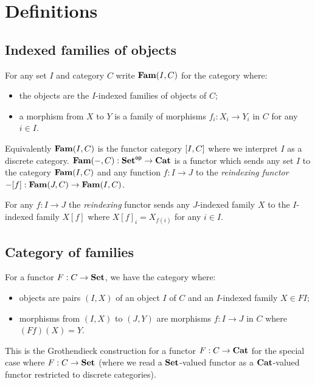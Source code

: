 \section{Definitions}

\subsection{Indexed families of objects}

For any set $I$ and category $C$ write $\mathbf{Fam}(I,C)$ for the category where:
\begin{itemize}
\item the objects are the $I$-indexed families of objects of $C$;
\item a morphism from $X$ to $Y$ is a family of morphisms $f_i: X_i \to Y_i$ in $C$ for any $i \in I$.
\end{itemize}

\noindent Equivalently $\mathbf{Fam}(I,C)$ is the functor category $[I,C]$ where we interpret $I$ as a discrete
category. $\mathbf{Fam}(-,C): \mathbf{Set}^{\mathsf{op}} \to \mathbf{Cat}$ is a functor which sends any set $I$ to the category $\mathbf{Fam}(I,C)$
and any function $f: I \to J$ to the \emph{reindexing functor} $-[f]: \mathbf{Fam}(J,C) \to \mathbf{Fam}(I,C)$.

\begin{definition}[Reindexing]
For any $f: I \to J$ the \emph{reindexing} functor sends any $J$-indexed family $X$ to the $I$-indexed family
$X[f]$ where $X[f]_i = X_{f(i)}$ for any $i \in I$.
\end{definition}

\subsection{Category of families}

For a functor $F: C \to \mathbf{Set}$, we have the category where:
\begin{itemize}
\item objects are pairs $(I, X)$ of an object $I$ of $C$ and an $I$-indexed family $X \in FI$;
\item morphisms from $(I, X)$ to $(J, Y)$ are morphisms $f: I \to J$ in $C$ where $(Ff)(X) = Y$.
\end{itemize}

\noindent This is the Grothendieck construction for a functor $F: C \to \mathbf{Cat}$ for the special case where $F: C
\to \mathbf{Set}$ (where we read a $\mathbf{Set}$-valued functor as a $\mathbf{Cat}$-valued functor restricted to discrete
categories).

